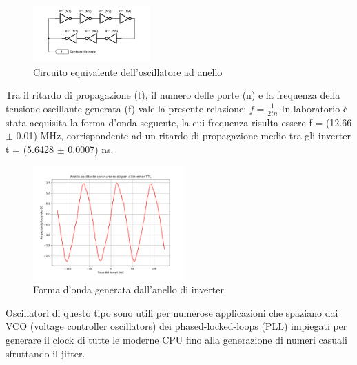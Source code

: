 \documentclass[journal]{IEEEtran}
\begin{document}
\begin{figure}[H]%
\begin{center}
\includegraphics[width=0.40\textwidth]{sch-simulations/digital/output/ring-osc-logic.pdf}
\caption{Circuito equivalente dell'oscillatore ad anello}
\label{fig:circuit_ring_oscillator}
\end{center}
\end{figure}

Tra il ritardo di propagazione (t), il numero delle porte (n) e la frequenza della tensione oscillante generata (f) vale la presente relazione: 
\begin{math}
f = \frac{1}{2tn}
\end{math}
In laboratorio è stata acquisita la forma d'onda seguente, la cui frequenza risulta essere f = (12.66 $\pm$ 0.01) MHz, corrispondente ad un ritardo di propagazione medio tra gli inverter t = (5.6428 $\pm$ 0.0007) ns.


\begin{figure}[H]%
\begin{center}
\includegraphics[width=0.52\textwidth]{analysis/output/oscillating-ring.pdf}
\caption{Forma d'onda generata dall'anello di inverter}
\label{fig:graph_ring_oscillator}
\end{center}
\end{figure}


Oscillatori di questo tipo sono utili per numerose applicazioni che spaziano dai VCO (voltage controller oscillators) dei phased-locked-loops (PLL) impiegati per generare il clock di tutte le moderne CPU fino alla generazione di numeri casuali sfruttando il jitter.

\end{document}
